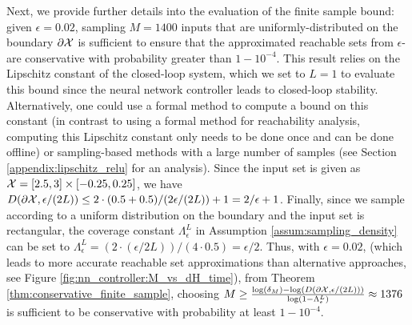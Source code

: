 \documentclass[12pt]{l4dc2022} %
\begin{document}
Next, we provide further details into the evaluation of the finite sample bound: given $\epsilon=0.02$, %
sampling $M=1400$ %
inputs that are uniformly-distributed on the boundary $\partial\mathcal{X}$ is sufficient to ensure that the approximated reachable sets from $\epsilon$-\randup are conservative with probability greater than $1-10^{-4}$. 
This result relies on the Lipschitz constant of the closed-loop system, which we set to $L=1$ to evaluate this bound since the neural network controller leads to closed-loop stability. Alternatively, one could use a formal method to compute a bound on this constant (in contrast to using a formal method for reachability analysis, computing this Lipschitz constant only needs to be done once and can be done offline) or sampling-based methods with a large number of samples (see Section \ref{appendix:lipschitz_relu} for an analysis). 
% 
Since the input set is given as $\mathcal{X}=[2.5,3]\times[-0.25,0.25]$, we have $D(\partial\mathcal{X}, \epsilon/(2L))\leq 2\cdot(0.5+0.5)/(2\epsilon/(2L)) + 1=2/\epsilon+1$. 
Finally, since we sample according to a uniform distribution on the boundary and the input set is rectangular, the coverage constant $\Lambda_\epsilon^L$ in Assumption \ref{assum:sampling_density} can be set to $\Lambda_\epsilon^L=(2\cdot(\epsilon/2L)) / (4\cdot0.5)=\epsilon/2$. 
Thus, with $\epsilon=0.02$, %
(which leads to more accurate reachable set approximations than alternative approaches, see Figure \ref{fig:nn_controller:M_vs_dH_time}), from Theorem \ref{thm:conservative_finite_sample}, choosing $M\geq \frac{\log(\delta_M)-\log(D(\partial\mathcal{X},\epsilon/(2L)))}{\log(1-\Lambda_\epsilon^L)}\approx 1376$ %
is sufficient to be conservative with probability at least $1-10^{-4}$.
% 
% 
% 
% 
% 
% 
% 
% 
\end{document}
